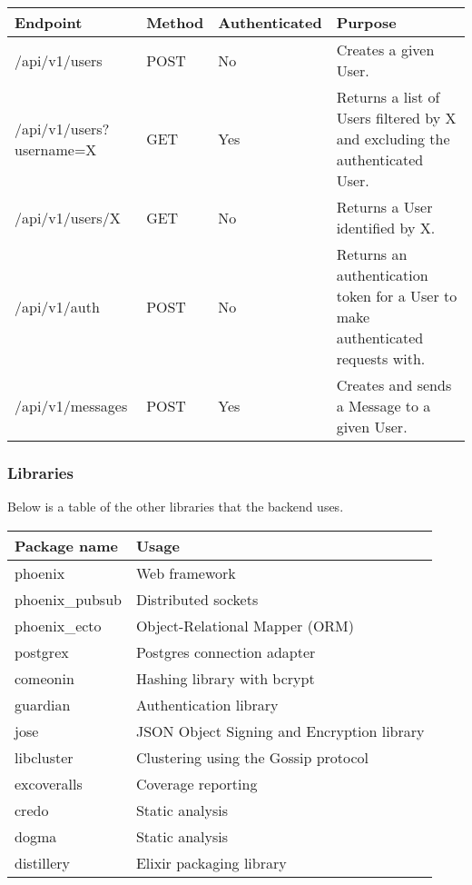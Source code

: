 \documentclass[11pt,a4paper]{report}
\begin{document}
\begin{center}
\begin{tabular}{ | l | l | l | p{4cm} |}
  \hline
  Endpoint & Method & Authenticated & Purpose \\
  \hline
  /api/v1/users & POST & No & Creates a given User. \\
  \hline
  /api/v1/users?username=X & GET & Yes & Returns a list of Users filtered by X and excluding the authenticated User. \\
  \hline
  /api/v1/users/X & GET & No & Returns a User identified by X. \\
  \hline
  /api/v1/auth & POST & No & Returns an authentication token for a User to make authenticated requests with. \\
  \hline
  /api/v1/messages & POST & Yes & Creates and sends a Message to a given User. \\
  \hline
\end{tabular}
\end{center}

\subsubsection{Libraries}

Below is a table of the other libraries that the backend uses.

\begin{tabular}{ | l | l |}
  \hline
  Package name & Usage \\
  \hline
  phoenix & Web framework \\
  phoenix\_pubsub & Distributed sockets \\
  phoenix\_ecto & Object-Relational Mapper (ORM) \\
  \hline
  postgrex & Postgres connection adapter \\
  comeonin & Hashing library with bcrypt \\
  guardian & Authentication library \\
  jose & JSON Object Signing and Encryption library \\
  libcluster & Clustering using the Gossip protocol \\
  \hline
  excoveralls & Coverage reporting \\
  credo & Static analysis \\
  dogma & Static analysis \\
  distillery & Elixir packaging library \\
  \hline
\end{tabular}
\end{document}
